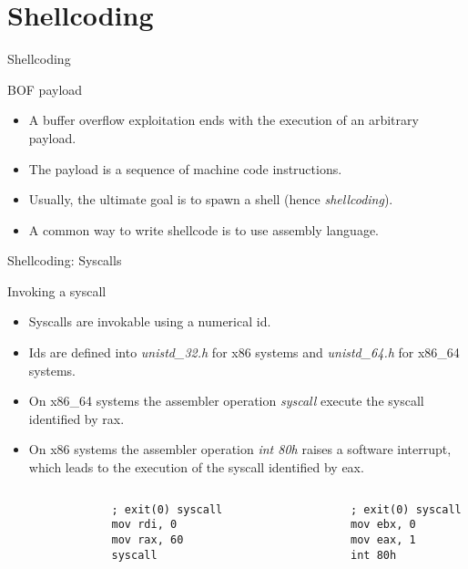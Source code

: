 \section{Shellcoding}
\begin{frame}{Shellcoding}
	\begin{block}{BOF payload}
		\begin{itemize}
			\item A buffer overflow exploitation ends with the execution of an arbitrary payload.
			\item The payload is a sequence of machine code instructions.
			\item Usually, the ultimate goal is to spawn a shell (hence \emph{shellcoding}).
			\item A common way to write shellcode is to use assembly language.
		\end{itemize}
	\end{block}

\end{frame}

\begin{frame}[fragile]{Shellcoding: Syscalls}
	\begin{block}{Invoking a syscall}
		\begin{itemize}
			\item Syscalls are invokable using a numerical id.
			\item Ids are defined into \emph{unistd\_32.h} for x86 systems and \emph{unistd\_64.h} for x86\_64 systems.
			\item On x86\_64 systems the assembler operation \emph{syscall} execute the syscall identified by rax.
			\item On x86 systems the assembler operation \emph{int 80h} raises a software interrupt, which leads to the execution
				of the syscall identified by eax.
		\end{itemize}
	\end{block}
	\acode
	\begin{columns}[T]
		\begin{column}{.4\textwidth}
			\begin{lstlisting}
				; exit(0) syscall
				mov rdi, 0
				mov rax, 60
				syscall
			\end{lstlisting}
		\end{column}
		\begin{column}{.4\textwidth}
			\begin{lstlisting}
				; exit(0) syscall
				mov ebx, 0
				mov eax, 1
				int 80h
			\end{lstlisting}
		\end{column}
	\end{columns}
\end{frame}


